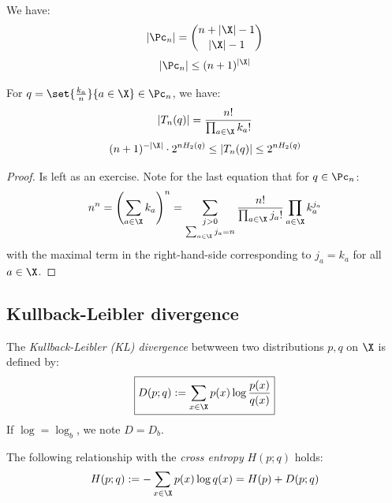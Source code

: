\documentclass[toc, titlepaged]{../cs-classes/cs-classes}
\begin{document}
\begin{lemma}
    We have:
    \begin{equation}
        |\Pc_n|=\binom{n+|\X|-1}{|\X|-1}
    \end{equation}
    \begin{equation}
        |\Pc_n|\leq(n+1)^{|\X|}
    \end{equation}

    For $q=\set{\frac{k_a}{n}}{a\in\X}\in\Pc_n$, we have:
    \begin{equation}
        |T_n(q)|=\frac{n!}{\prod_{a\in\X}k_a!}
    \end{equation}
    \begin{equation}
        (n+1)^{-|\X|} \cdot 2^{nH_2(q)} \leq |T_n(q)| \leq 2^{nH_2(q)}
    \end{equation}
\end{lemma}
\begin{proof}
    Is left as an exercise. Note for the last equation that for $q\in\Pc_n$:
    \begin{equation*}
        n^n = \left(\sum_{a\in\X}k_a\right)^n = \sum_{\substack{j>0\\\sum_{a\in\X}j_a=n}} \frac{n!}{\prod_{a\in\X}j_a!} \prod_{a\in\X}k_a^{j_a}
    \end{equation*}
    with the maximal term in the right-hand-side corresponding to $j_a=k_a$ for all $a\in\X$.
\end{proof}

\subsection{Kullback-Leibler divergence}
\begin{definition}
    The \emph{Kullback-Leibler (KL) divergence} betwween two distributions $p, q$ on $\X$ is defined by:
    \begin{equation}
        \boxed{D(p; q) := \sum_{x\in\X}p(x)\log\frac{p(x)}{q(x)}}
    \end{equation}
    If $\log=\log_b$, we note $D=D_b$.
\end{definition}

\begin{property}
    The following relationship with the \emph{cross entropy} $H(p; q)$ holds:
    \begin{equation}
        \label{eq:relationship-cross-entropy}
        H(p; q) := - \sum_{x\in\X}p(x)\log q(x) = H(p) + D(p; q)
    \end{equation}
\end{property}
\end{document}
